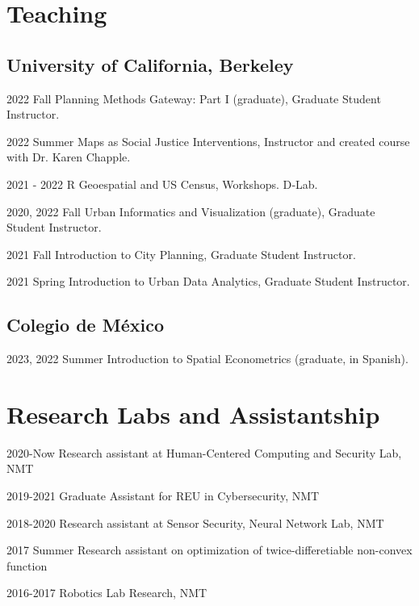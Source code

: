 \documentclass[12pt,letterpaper]{report}
\begin{document}
    \section*{Teaching}
    \subsection*{University of California, Berkeley}
    \begin{tablist}
        \item[2022 Fall] \tab{}Planning Methods Gateway: Part I (graduate), Graduate Student Instructor.
        \item[2022 Summer] \tab{}Maps as Social Justice Interventions, Instructor and created course with Dr. Karen Chapple.
        \item[2021 - 2022] \tab{}R Geoespatial and US Census, Workshops. D‐Lab.
        \item[2020, 2022 Fall] \tab{}Urban Informatics and Visualization (graduate), Graduate Student Instructor.
        \item[2021 Fall] \tab{}Introduction to City Planning, Graduate Student Instructor.
        \item[2021 Spring] \tab{}Introduction to Urban Data Analytics, Graduate Student Instructor.
    \end{tablist}
    
    \subsection*{Colegio de México}
        \begin{tablist}
        \item[2023, 2022 Summer] \tab{}Introduction to Spatial Econometrics (graduate, in Spanish).
    \end{tablist}



    \section*{Research Labs and Assistantship}
    \begin{tablist}
        \item[2020-Now] \tab{}Research assistant at Human-Centered Computing and Security Lab, NMT
        \item[2019-2021] \tab{}Graduate Assistant for REU in Cybersecurity, NMT
        \item[2018-2020] \tab{}Research assistant at Sensor Security, Neural Network Lab, NMT
        \item[2017 Summer] \tab{}Research assistant on optimization of twice-differetiable non-convex function
        \item[2016-2017] \tab{}Robotics Lab Research, NMT
    \end{tablist}
\end{document}
